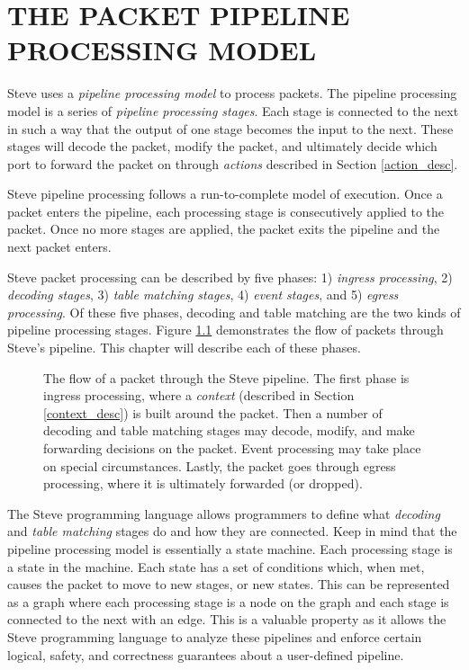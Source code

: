 \chapter{THE PACKET PIPELINE PROCESSING MODEL} \label{ch:pipeline_model}

Steve uses a \textit{pipeline processing model} to process packets. The pipeline
processing model is a series of \textit{pipeline processing stages}. Each stage is
connected to the next in such a way that the output of one stage becomes the
input to the next. These stages will decode the packet, modify the packet, and
ultimately decide which port to forward the packet on through \textit{actions} described in Section \ref{action_desc}.

Steve pipeline processing follows a run-to-complete model of execution. Once a packet
enters the pipeline, each processing stage is consecutively applied to the
packet. Once no more stages are applied, the packet exits the pipeline and the next packet enters.

Steve packet processing can be described by five phases: 1) \textit{ingress
processing}, 2) \textit{decoding stages}, 3) \textit{table matching stages}, 4) \textit{event stages}, and
5) \textit{egress processing}. Of these five phases, decoding and table matching
are the two kinds of pipeline processing stages. Figure \ref{fg:pipeline_model}
demonstrates the flow of packets through Steve's pipeline. This chapter will
describe each of these phases.

\begin{figure}
\caption{The flow of a packet through the Steve pipeline. The first phase is
ingress processing, where a \textit{context} (described in Section
\ref{context_desc}) is built around the packet. Then a number of decoding and
table matching stages may decode, modify, and make forwarding decisions on the
packet. Event processing may take place on special circumstances. Lastly, the packet goes through egress processing, where it is
ultimately forwarded (or dropped).}
\label{fg:pipeline_model}
\end{figure}

The Steve programming language allows programmers to define what
\textit{decoding} and \textit{table matching} stages do and how they are
connected. Keep in mind that the pipeline processing model is essentially a
state machine. Each processing stage is a state in the machine. Each state has a
set of conditions which, when met, causes the packet to move to new stages, or
new states. This can be represented as a graph where each processing stage is a
node on the graph and each stage is connected to the next with an edge. This is
a valuable property as it allows the Steve programming language to analyze these
pipelines and enforce certain logical, safety, and correctness guarantees about
a user-defined pipeline.

